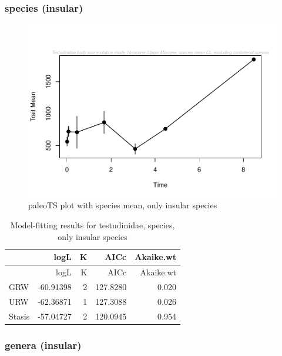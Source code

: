 \documentclass[]{article}
\begin{document}
\newpage

\subsubsection{species (insular)}\label{species-insular}

\begin{figure}[htbp]
\centering
\includegraphics{MA_JJ_files/figure-latex/paleoTS plot with species mean, excluding continental species-1.pdf}
\caption{paleoTS plot with species mean, only insular species}
\end{figure}

\begin{longtable}[]{@{}lrrrr@{}}
\caption{Model-fitting results for testudinidae, species, only insular
species}\tabularnewline
\toprule
& logL & K & AICc & Akaike.wt\tabularnewline
\midrule
\endfirsthead
\toprule
& logL & K & AICc & Akaike.wt\tabularnewline
\midrule
\endhead
GRW & -60.91398 & 2 & 127.8280 & 0.020\tabularnewline
URW & -62.36871 & 1 & 127.3088 & 0.026\tabularnewline
Stasis & -57.04727 & 2 & 120.0945 & 0.954\tabularnewline
\bottomrule
\end{longtable}

\newpage

\subsubsection{genera (insular)}\label{genera-insular}
\end{document}

